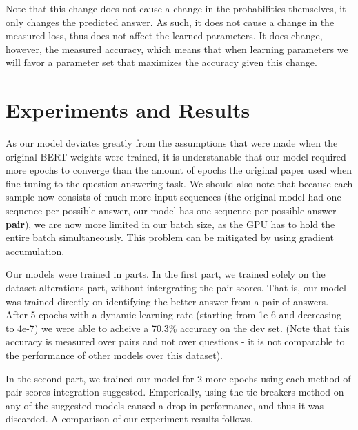 \documentclass{article}
\begin{document}
Note that this change does not cause a change in the probabilities themselves, it only changes the predicted answer. As such, it does not cause a change in the measured loss, thus does not affect the learned parameters. It does change, however, the measured accuracy, which means that when learning parameters we will favor a parameter set that maximizes the accuracy given this change.

\section{Experiments and Results} 

As our model deviates greatly from the assumptions that were made when the original BERT weights were trained, it is understanable that our model required more epochs to converge than the amount of epochs the original paper used when fine-tuning to the question answering task.
We should also note that because each sample now consists of much more input sequences (the original model had one sequence per possible answer, our model has one sequence per possible answer \textbf{pair}), we are now more limited in our batch size, as the GPU has to hold the entire batch simultaneously. This problem can be mitigated by using gradient accumulation.

Our models were trained in parts.
In the first part, we trained solely on the dataset alterations part, without intergrating the pair scores. That is, our model was trained directly on identifying the better answer from a pair of answers. After 5 epochs with a dynamic learning rate (starting from 1e-6 and decreasing to 4e-7) we were able to acheive a 70.3\% accuracy on the dev set. (Note that this accuracy is measured over pairs and not over questions - it is not comparable to the performance of other models over this dataset).

In the second part, we trained our model for 2 more epochs using each method of pair-scores integration suggested. Emperically, using the tie-breakers method on any of the suggested models caused a drop in performance, and thus it was discarded.
A comparison of our experiment results follows.
\end{document}
